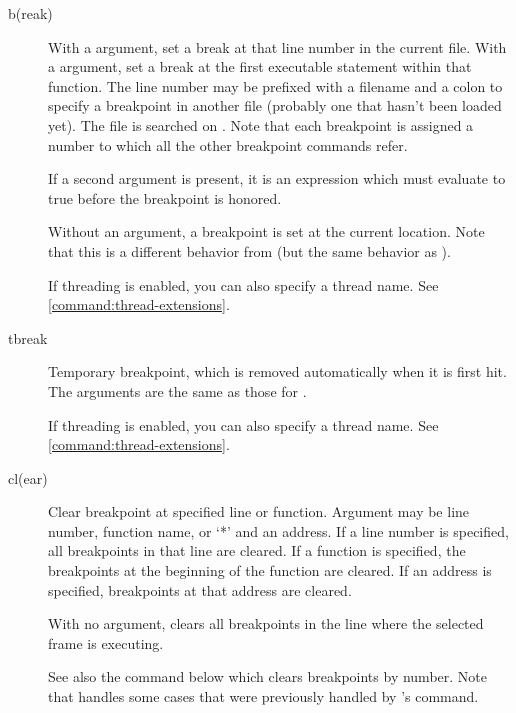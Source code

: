 \begin{description}
\item[b(reak) ]\label{command:break}

With a  argument, set a break at that line number in the
current file.  With a  argument, set a break at the
first executable statement within that function.  The line number may
be prefixed with a filename and a colon to specify a breakpoint in
another file (probably one that hasn't been loaded yet).  The file is
searched on .  Note that each breakpoint is assigned a
number to which all the other breakpoint commands refer.

If a second argument is present, it is an expression which must
evaluate to true before the breakpoint is honored.

Without an argument, a breakpoint is set at the current location.
Note that this is a different behavior from  (but the same
behavior as ).

If threading is enabled, you can also specify a thread name. See \ref{command:thread-extensions}.

\item[tbreak ]\label{command:tbreak}

Temporary breakpoint, which is removed automatically when it is
first hit.  The arguments are the same as those for .

If threading is enabled, you can also specify a thread name. See \ref{command:thread-extensions}.

\item[cl(ear) ]

Clear breakpoint at specified line or function.  Argument may be line
number, function name, or `*' and an address.  If a line number is
specified, all breakpoints in that line are cleared.  If a function is
specified, the breakpoints at the beginning of the function are cleared.  If an
address is specified, breakpoints at that address are cleared.

With no argument, clears all breakpoints in the line where the selected
frame is executing.

See also the  command below which clears breakpoints by
number. Note that  handles some cases that were
previously handled by 's  command.


\end{description}
